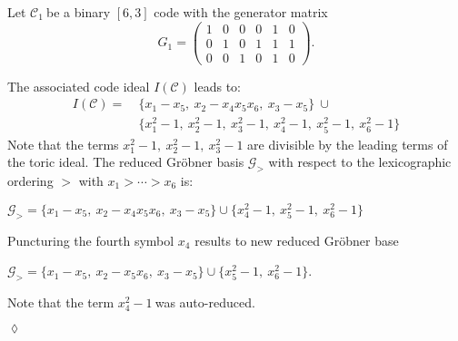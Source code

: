 \begin{env_example} \normalfont
 Let $\mathcal{C}_{1}~$be a binary $[6,3]$ code with the generator matrix
\[
G_{1} =
\begin{pmatrix}
1 & 0 & 0 & 0 & 1 & 0 \\ 
0 & 1 & 0 & 1 & 1 & 1 \\  
0 & 0 & 1 & 0 & 1 & 0  
\end{pmatrix} 
.\]

The associated code ideal $I(\mathcal{C})$ leads to: \newline
\begin{align*}
I(\mathcal{C}) = &~\{x_{1}-x_{5},~x_{2}-x_{4}x_{5}x_{6},~x_{3}-x_{5}  \} ~\cup \\ &~\{x_{1}^{2}-1,~x_{2}^{2}-1,~x_{3}^{2}-1,~x_{4}^{2}-1,~x_{5}^{2}-1,~x_{6}^{2}-1\}
\end{align*}
Note that the terms $x_{1}^{2}-1,~x_{2}^{2}-1,~x_{3}^{2}-1 $ are divisible by the leading terms of the toric ideal.
The reduced Gröbner basis $\mathcal{G}_{>}$ with respect to the lexicographic ordering $>$ with $x_{1} > \cdots > x_{6}$ is:
\begin{center}
$ \mathcal{G}_{>} = \{x_{1}-x_{5},~x_{2}-x_{4}x_{5}x_{6},~x_{3}-x_{5}  \} \cup \{x_{4}^{2}-1,~x_{5}^{2}-1,~x_{6}^{2}-1  \}  $
\end{center}

Puncturing the fourth symbol $x_4$ results to new reduced Gröbner base 
\begin{center}
$ \mathcal{G}_{>} = \{x_{1}-x_{5},~x_{2}-x_{5}x_{6},~x_{3}-x_{5}  \} \cup \{x_{5}^{2}-1,~x_{6}^{2}-1  \}  $.
\end{center}
Note that the term $x_{4}^{2}-1~$was auto-reduced.


\begin{flushright}
$\lozenge$
\end{flushright} 

\end{env_example}

 

\newpage